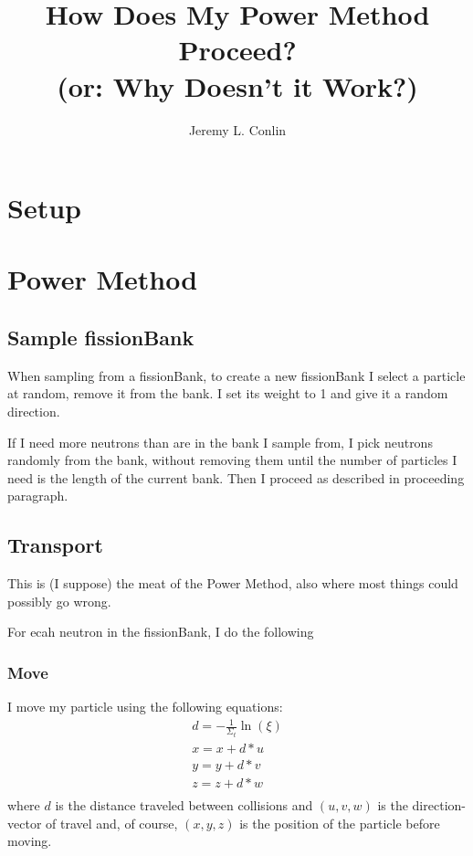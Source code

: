 \documentclass[11pt]{article}
\title{How Does My Power Method Proceed?\\\large{(or: Why Doesn't it Work?)}}
\author{Jeremy L. Conlin}
\begin{document}
\maketitle


\section{Setup}

\section{Power Method}

\subsection{Sample fissionBank}
When sampling from a fissionBank, to create a new fissionBank I select a particle at random, remove it from the bank.  I set its weight to 1 and give it a random direction.

If I need more neutrons than are in the bank I sample from, I pick neutrons randomly from the bank, without removing them until the number of particles I need is the length of the current bank.  Then I proceed as described in proceeding paragraph.

\subsection{Transport}
This is (I suppose) the meat of the Power Method, also where most things could possibly go wrong.

For ecah neutron in the fissionBank, I do the following

\subsubsection{Move}\label{sec:Move} I move my particle using the following equations:
\begin{subequations}
    \begin{eqnarray}
        d = -\frac{1}{\Sigma_t}\ln(\xi) \\
        x = x + d*u \\
        y = y + d*v \\
        z = z + d*w \\
    \end{eqnarray}
\end{subequations}
where $d$ is the distance traveled between collisions and $(u,v,w)$ is the direction-vector of travel and, of course, $(x,y,z)$ is the position of the particle before moving.
\end{document}

